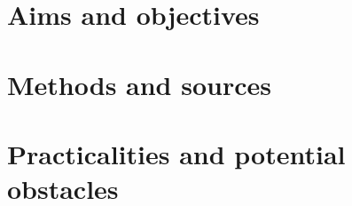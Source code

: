 \section{Aims and objectives}
\section{Methods and sources}
\section{Practicalities and potential obstacles}